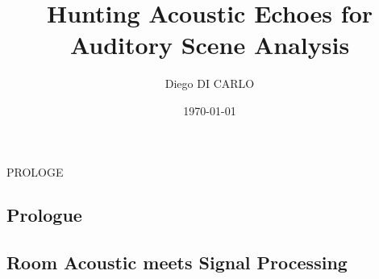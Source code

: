 \documentclass[pdftex,dvipsnames]{dissertation}
\title{Hunting Acoustic Echoes for Auditory Scene Analysis}
\author{Diego DI CARLO}
\date{\today}
\begin{document}
\frontmatter{}

% 



\blankpage{}

\blankpage{}

\begin{otherlanguage}{french}

\end{otherlanguage}


\cleardoublepage{}

\doparttoc[n]
\tableofcontents*{}
\clearpage{}


\cleardoublepage{}
\clearpage{}





\cleardoublepage{}

\setcounter{mtc}{9}

\mainmatter{}

PROLOGE
\begin{fullwidth}
    \part{Prologue}
\end{fullwidth}
\parttoc[n]
\cleardoublepage{}



\begin{fullwidth}
    \part{Room Acoustic meets Signal Processing}\label{pt:background}
\end{fullwidth}
\parttoc[n]


\end{document}

